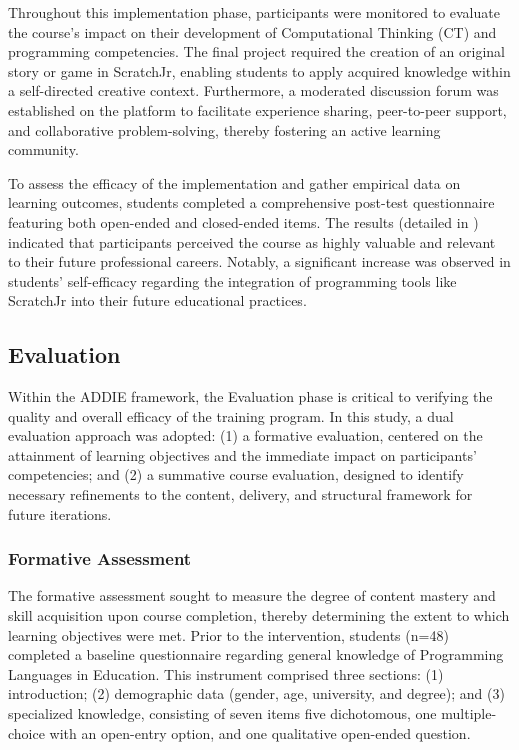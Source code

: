 \documentclass[english]{textolivre}
\begin{document}
Throughout this implementation phase, participants were monitored to evaluate the course's impact on their development of Computational Thinking (CT) and programming competencies. The final project required the creation of an original story or game in ScratchJr, enabling students to apply acquired knowledge within a self-directed creative context. Furthermore, a moderated discussion forum was established on the platform to facilitate experience sharing, peer-to-peer support, and collaborative problem-solving, thereby fostering an active learning community.

To assess the efficacy of the implementation and gather empirical data on learning outcomes, students completed a comprehensive post-test questionnaire featuring both open-ended and closed-ended items. The results (detailed in \textcite{ibanez2023evaluation}) indicated that participants perceived the course as highly valuable and relevant to their future professional careers. Notably, a significant increase was observed in students' self-efficacy regarding the integration of programming tools like ScratchJr into their future educational practices.

\subsection{Evaluation}
Within the ADDIE framework, the Evaluation phase is critical to verifying the quality and overall efficacy of the training program. In this study, a dual evaluation approach was adopted: (1) a formative evaluation, centered on the attainment of learning objectives and the immediate impact on participants' competencies; and (2) a summative course evaluation, designed to identify necessary refinements to the content, delivery, and structural framework for future iterations.

\subsubsection{Formative Assessment}

The formative assessment sought to measure the degree of content mastery and skill acquisition upon course completion, thereby determining the extent to which learning objectives were met. Prior to the intervention, students (n=48) completed a baseline questionnaire regarding general knowledge of Programming Languages in Education. This instrument comprised three sections: (1) introduction; (2) demographic data (gender, age, university, and degree); and (3) specialized knowledge, consisting of seven items five dichotomous, one multiple-choice with an open-entry option, and one qualitative open-ended question.
\end{document}
